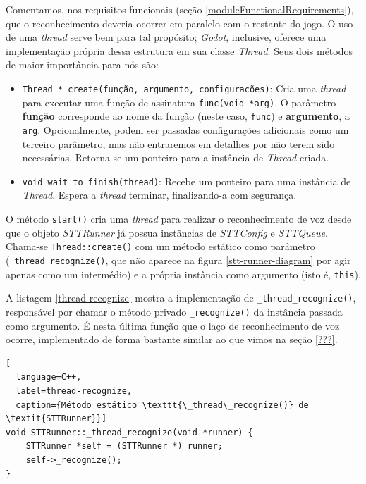 Comentamos, nos requisitos funcionais (seção \ref{moduleFunctionalRequirements}), que o reconhecimento deveria ocorrer em paralelo com o restante do jogo. O uso de uma \textit{thread} serve bem para tal propósito; \textit{Godot}, inclusive, oferece uma implementação própria dessa estrutura em sua classe \textit{Thread}. Seus dois métodos de maior importância para nós são:

\begin{itemize}
\item \texttt{Thread * create(função, argumento, configurações)}: Cria uma \textit{thread} para executar uma função de assinatura \texttt{func(void *arg)}. O parâmetro \textbf{função} corresponde ao nome da função (neste caso, \texttt{func}) e \textbf{argumento}, a \texttt{arg}. Opcionalmente, podem ser passadas configurações adicionais como um terceiro parâmetro, mas não entraremos em detalhes por não terem sido necessárias. Retorna-se um ponteiro para a instância de \textit{Thread} criada.

\item \texttt{void wait\_to\_finish(thread)}: Recebe um ponteiro para uma instância de \textit{Thread}. Espera a \textit{thread} terminar, finalizando-a com segurança.
\end{itemize}

O método \texttt{start()} cria uma \textit{thread} para realizar o reconhecimento de voz desde que o objeto \textit{STTRunner} já possua instâncias de \textit{STTConfig} e \textit{STTQueue}. Chama-se \texttt{Thread::create()} com um método estático como parâmetro (\texttt{\_thread\_recognize()}, que não aparece na figura \ref{stt-runner-diagram} por agir apenas como um intermédio) e a própria instância como argumento (isto é, \texttt{this}).

A listagem \ref{thread-recognize} mostra a implementação de \texttt{\_thread\_recognize()}, responsável por chamar o método privado \texttt{\_recognize()} da instância passada como argumento. É nesta última função que o laço de reconhecimento de voz ocorre, implementado de forma bastante similar ao que vimos na seção \ref{???}.

\begin{lstlisting}[
  language=C++,
  label=thread-recognize,
  caption={Método estático \texttt{\_thread\_recognize()} de \textit{STTRunner}}]
void STTRunner::_thread_recognize(void *runner) {
    STTRunner *self = (STTRunner *) runner;
    self->_recognize();
}
\end{lstlisting}

